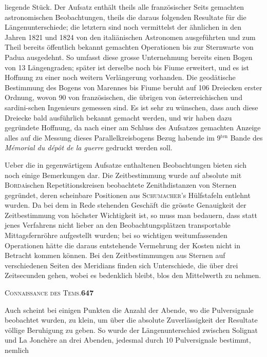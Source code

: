\documentclass[12pt,a4paper]{article}
\begin{document}
liegende St\"uck. Der Aufsatz enth\"alt theils alle franz\"osischer Seits gemachten astronomischen Beobachtungen, theils die daraus folgenden Resultate f\"ur die L\"angenunterschiede; die letztern sind noch vermittelst der \"ahnlichen in den Jahren 1821 und 1824 von den itali\"anischen Astronomen ausgef\"uhrten und zum Theil bereits \"offentlich bekannt gemachten Operationen bis zur Sternwarte von Padua ausgedehnt. So umfasst diese grosse Unternehmung bereits einen Bogen von 13 L\"angengraden; sp\"ater ist derselbe noch bis Fiume erweitert, und es ist Hoffnung zu einer noch weitern Verl\"angerung vorhanden. Die geod\"atische Bestimmung des Bogens von Marennes bis Fiume beruht auf 106 Dreiecken erster Ordnung, wovon 90 von franz\"osischen, die \"ubrigen von \"osterreichischen und sardini-\newline schen Ingenieurs gemessen sind. Es ist sehr zu w\"unschen, dass auch diese Dreiecke bald ausf\"uhrlich bekannt gemacht werden, und wir haben dazu gegr\"undete Hoffnung, da nach einer am Schluss des Aufsatzes gemachten Anzeige alles auf die Messung dieses Parallelkreisbogens Bezug habende im 9$^{\text{ten}}$ Bande des \textit{M\'emorial du d\'ep\^ot de la guerre} gedruckt werden soll.

Ueber die in gegenw\"artigem Aufsatze enthaltenen Beobachtungen bieten sich noch einige Bemerkungen dar. Die Zeitbestimmung wurde auf absolute mit \textsc{Borda}ischen Repetitionskreisen beobachtete Zenithdistanzen von Sternen gegr\"undet, deren scheinbare Positionen aus \textsc{Schumacher}'s H\"ulfstafeln entlehnt wurden. Da bei dem in Rede stehenden Gesch\"aft die gr\"osste Genauigkeit der Zeitbestimmung von h\"ochster Wichtigkeit ist, so muss man bedauern, dass statt jenes Verfahrens nicht lieber an den Beobachtungspl\"atzen transportable Mittagsfernr\"ohre aufgestellt wurden; bei so wichtigen weitumfassenden Operationen h\"atte die daraus entstehende Vermehrung der Kosten nicht in Betracht kommen k\"onnen. Bei den Zeitbestimmungen aus Sternen auf verschiedenen Seiten des Meridians finden sich Unterschiede, die \"uber drei Zeitsecunden gehen, wobei es bedenklich bleibt, blos den Mittelwerth zu nehmen.

\begin{center}
\small\textsc{Connaissance des Tems.}\quad\textbf{647}
\end{center}

Auch scheint bei einigen Punkten die Anzahl der Abende, wo die Pulversignale beobachtet wurden, zu klein, um \"uber die absolute Zuverl\"assigkeit der Resultate v\"ollige Beruhigung zu geben. So wurde der L\"angenunterschied zwischen Solignat und La Jonch\`ere an drei Abenden, jedesmal durch 10 Pulversignale bestimmt, nemlich
\end{document}
